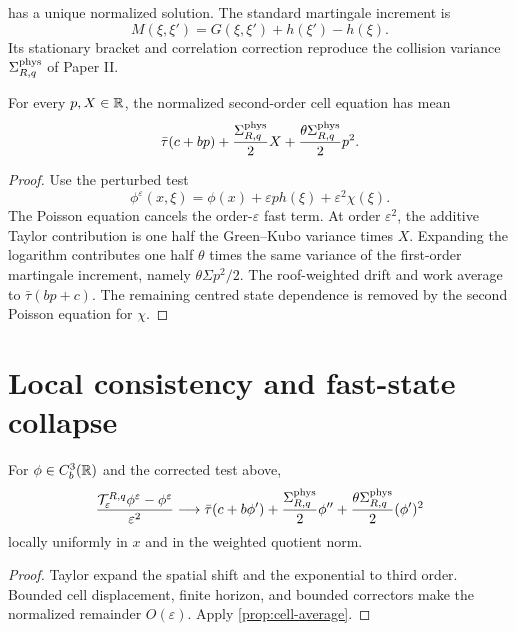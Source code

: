 has a unique normalized solution.  The standard martingale increment is
\[
 M(\xi,\xi')=G(\xi,\xi')+h(\xi')-h(\xi).
\]
Its stationary bracket and correlation correction reproduce the collision
variance $\Sigma_{R,q}^{\rm phys}$ of Paper II.

\begin{proposition}\label{prop:cell-average}
For every $p,X\in\mathbb R$, the normalized second-order cell equation has mean
\[
 \bar\tau(c+bp)
 +\frac{\Sigma_{R,q}^{\rm phys}}2X
 +\frac{\theta\Sigma_{R,q}^{\rm phys}}2p^2.
\]
\end{proposition}
\begin{proof}
Use the perturbed test
\[
 \phi^\varepsilon(x,\xi)
 =\phi(x)+\varepsilon p h(\xi)+\varepsilon^2\chi(\xi).
\]
The Poisson equation cancels the order-$\varepsilon$ fast term.  At order
$\varepsilon^2$, the additive Taylor contribution is one half the
Green--Kubo variance times $X$.  Expanding the logarithm contributes one half
$\theta$ times the same variance of the first-order martingale increment,
namely $\theta\Sigma p^2/2$.  The roof-weighted drift and work average to
$\bar\tau(bp+c)$.  The remaining centred state dependence is removed by the
second Poisson equation for $\chi$.
\end{proof}

\section{Local consistency and fast-state collapse}\label{sec:consistency}
\begin{theorem}\label{thm:consistency}
For $\phi\in C_b^3(\mathbb R)$ and the corrected test above,
\[
 \frac{\mathcal T_\varepsilon^{R,q}\phi^\varepsilon-
       \phi^\varepsilon}{\varepsilon^2}
 \longrightarrow
 \bar\tau(c+b\phi')
 +\frac{\Sigma_{R,q}^{\rm phys}}2\phi''
 +\frac{\theta\Sigma_{R,q}^{\rm phys}}2(\phi')^2
\]
locally uniformly in $x$ and in the weighted quotient norm.
\end{theorem}
\begin{proof}
Taylor expand the spatial shift and the exponential to third order.  Bounded
cell displacement, finite horizon, and bounded correctors make the normalized
remainder $O(\varepsilon)$.  Apply \cref{prop:cell-average}.
\end{proof}

